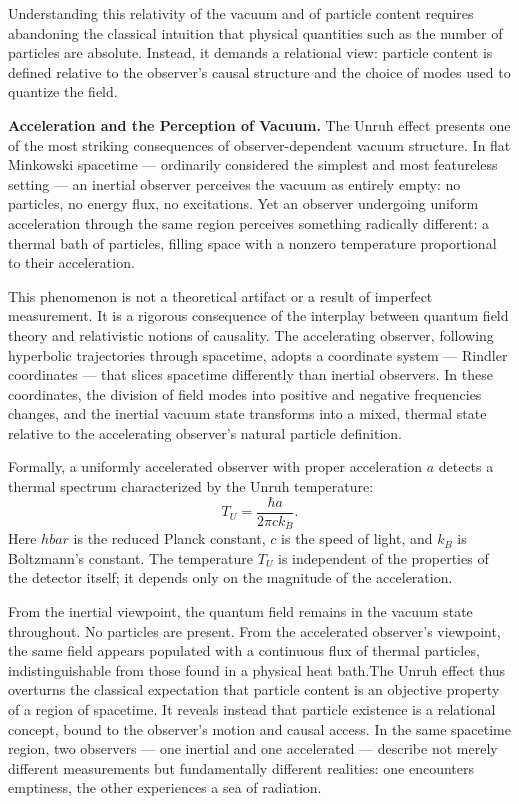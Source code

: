 Understanding this relativity of the vacuum and of particle content requires abandoning the classical intuition that physical quantities such as the number of particles are absolute. Instead, it demands a relational view: particle content is defined relative to the observer's causal structure and the choice of modes used to quantize the field.

\textbf{Acceleration and the Perception of Vacuum.} The Unruh effect presents one of the most striking consequences of observer-dependent vacuum structure. In flat Minkowski spacetime — ordinarily considered the simplest and most featureless setting — an inertial observer perceives the vacuum as entirely empty: no particles, no energy flux, no excitations. Yet an observer undergoing uniform acceleration through the same region perceives something radically different: a thermal bath of particles, filling space with a nonzero temperature proportional to their acceleration.

This phenomenon is not a theoretical artifact or a result of imperfect measurement. It is a rigorous consequence of the interplay between quantum field theory and relativistic notions of causality. The accelerating observer, following hyperbolic trajectories through spacetime, adopts a coordinate system — Rindler coordinates — that slices spacetime differently than inertial observers. In these coordinates, the division of field modes into positive and negative frequencies changes, and the inertial vacuum state transforms into a mixed, thermal state relative to the accelerating observer's natural particle definition.

Formally, a uniformly accelerated observer with proper acceleration $a$ detects a thermal spectrum characterized by the Unruh temperature:
\[
T_U = \frac{\hbar a}{2\pi c k_B}.
\]
Here $hbar$ is the reduced Planck constant, $c$ is the speed of light, and $k_B$ is Boltzmann's constant. The temperature $T_U$ is independent of the properties of the detector itself; it depends only on the magnitude of the acceleration.

From the inertial viewpoint, the quantum field remains in the vacuum state throughout. No particles are present. From the accelerated observer's viewpoint, the same field appears populated with a continuous flux of thermal particles, indistinguishable from those found in a physical heat bath.The Unruh effect thus overturns the classical expectation that particle content is an objective property of a region of spacetime. It reveals instead that particle existence is a relational concept, bound to the observer’s motion and causal access. In the same spacetime region, two observers — one inertial and one accelerated — describe not merely different measurements but fundamentally different realities: one encounters emptiness, the other experiences a sea of radiation.

